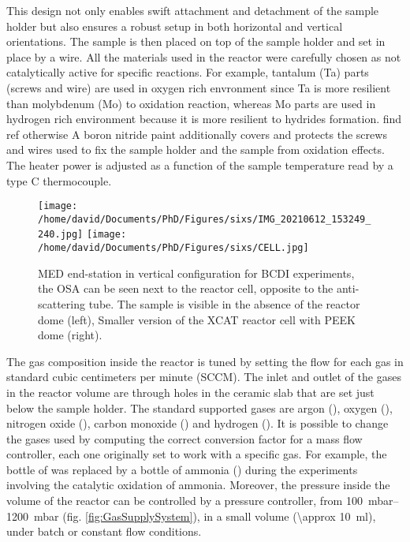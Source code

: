 This design not only enables swift attachment and detachment of the sample holder but also ensures a robust setup in both horizontal and vertical orientations.
The sample is then placed on top of the sample holder and set in place by a wire.
All the materials used in the reactor were carefully chosen as not catalytically active for specific reactions.
For example, tantalum (Ta) parts (screws and wire) are used in oxygen rich envronment since Ta is more resilient than molybdenum (Mo) to oxidation reaction, whereas Mo parts are used in hydrogen rich environment because it is more resilient to hydrides formation.
\textcolor{Important}{find ref otherwise}
A boron nitride paint additionally covers and protects the screws and wires used to fix the sample holder and the sample from oxidation effects.
The heater power is adjusted as a function of the sample temperature read by a type C thermocouple.

\begin{figure}[!htb]
    \centering
    \texttt{[image: /home/david/Documents/PhD/Figures/sixs/IMG\_20210612\_153249\_240.jpg]}
    \texttt{[image: /home/david/Documents/PhD/Figures/sixs/CELL.jpg]}
    \caption{
        MED end-station in vertical configuration for BCDI experiments, the OSA can be seen next to the reactor cell, opposite to the anti-scattering tube.
        The sample is visible in the absence of the reactor dome (left),
        Smaller version of the XCAT reactor cell with PEEK dome (right).
    }
    \label{fig:MEDV}
\end{figure}

The gas composition inside the reactor is tuned by setting the flow for each gas in standard cubic centimeters per minute (SCCM).
The inlet and outlet of the gases in the reactor volume are through holes in the ceramic slab that are set just below the sample holder.
The standard supported gases are argon (\argon), oxygen (\dioxygen), nitrogen oxide (\nitricoxide), carbon monoxide () and hydrogen ().
It is possible to change the gases used by computing the correct conversion factor for a mass flow controller, each one originally set to work with a specific gas.
For example, the bottle of  was replaced by a bottle of ammonia (\ammonia) during the experiments involving the catalytic oxidation of ammonia.
Moreover, the pressure inside the volume of the reactor can be controlled by a pressure controller, from \qtyrange{100}{1200}{\milli\bar} (fig. \ref{fig:GasSupplySystem}), in a small volume (\qty{\approx 10}{\ml}), under batch or constant flow conditions.

